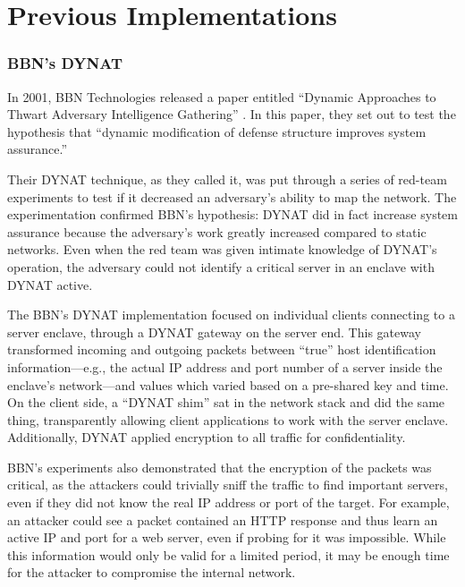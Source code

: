 \section{Previous Implementations}
\label{sec:related_research}


\subsubsection{BBN's \acf{DYNAT}}
\par In 2001, BBN Technologies released a paper entitled ``Dynamic Approaches to Thwart Adversary Intelligence Gathering'' \cite{BBNDYNAT}. In this paper, they set out to test the hypothesis that ``dynamic modification of defense structure improves system assurance.''

\par Their \ac{DYNAT} technique, as they called it, was put through a series of red-team experiments to test if it decreased an adversary's ability to map the network. The experimentation confirmed BBN's hypothesis: DYNAT did in fact increase system assurance because the adversary's work greatly increased compared to static networks. Even when the red team was given intimate knowledge of DYNAT's operation, the adversary could not identify a critical server in an enclave with DYNAT active.

\par The BBN's DYNAT implementation focused on individual clients connecting to a server enclave, through a DYNAT gateway on the server end. This gateway transformed incoming and outgoing packets between ``true'' host identification information---e.g., the actual IP address and port number of a server inside the enclave's network---and values which varied based on a pre-shared key and time. On the client side, a ``DYNAT shim'' sat in the network stack and did the same thing, transparently allowing client applications to work with the server enclave. Additionally, DYNAT applied encryption to all traffic for confidentiality.

\par BBN's experiments also demonstrated that the encryption of the packets was critical, as the attackers could trivially sniff the traffic to find important servers, even if they did not know the real IP address or port of the target. For example, an attacker could see a packet contained an \ac{HTTP} response and thus learn an active IP and port for a web server, even if probing for it was impossible. While this information would only be valid for a limited period, it may be enough time for the attacker to compromise the internal network.

